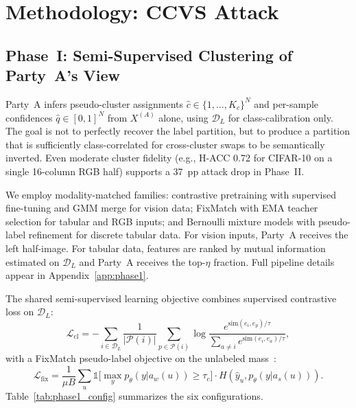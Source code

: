 \documentclass{article}
\begin{document}
\section{Methodology: CCVS Attack}
\label{sec:method}

\subsection{Phase~I: Semi-Supervised Clustering of Party~A's View}
\label{sec:phase1}

Party~A infers pseudo-cluster assignments
$\hat{c}\in\{1,\ldots,K_c\}^N$ and per-sample confidences
$\hat{q}\in[0,1]^N$ from $X^{(A)}$ alone, using $\mathcal{D}_L$ for
class-calibration only.
The goal is not to perfectly recover the label partition, but to produce a
partition that is sufficiently class-correlated for cross-cluster swaps to
be semantically inverted.
Even moderate cluster fidelity (e.g., H-ACC 0.72 for CIFAR-10 on a single
16-column RGB half) supports a 37~pp attack drop in Phase~II.

We employ modality-matched families: contrastive pretraining with supervised
fine-tuning and GMM merge for vision data; FixMatch with EMA teacher
selection for tabular and RGB inputs; and Bernoulli mixture models with
pseudo-label refinement for discrete tabular data.
For vision inputs, Party~A receives the left half-image.
For tabular data, features are ranked by mutual information estimated on
$\mathcal{D}_L$ and Party~A receives the top-$\eta$ fraction.
Full pipeline details appear in Appendix~\ref{app:phase1}.

The shared semi-supervised learning objective combines supervised contrastive
loss on $\mathcal{D}_L$:
\begin{equation}
  \mathcal{L}_{\mathrm{cl}}
  = -\!\sum_{i\in\mathcal{D}_L}
    \frac{1}{|\mathcal{P}(i)|}\!
    \sum_{p\in\mathcal{P}(i)}
    \log\frac{e^{\mathrm{sim}(e_i,e_p)/\tau}}
             {\sum_{a\neq i}e^{\mathrm{sim}(e_i,e_a)/\tau}},
  \label{eq:supcon}
\end{equation}
with a FixMatch pseudo-label objective on the unlabeled mass~\citep{sohn2020fixmatch}:
\begin{equation}
  \mathcal{L}_{\mathrm{fix}}
  = \frac{1}{\mu B}\!\sum_{u}
    \mathbb{1}\!\bigl[\max_y p_\theta(y|a_w(u))\geq\tau_c\bigr]
    \!\cdot\!H(\hat{y}_u,p_\theta(y|a_s(u))).
  \label{eq:fixmatch}
\end{equation}
Table~\ref{tab:phase1_config} summarizes the six configurations.
\end{document}
